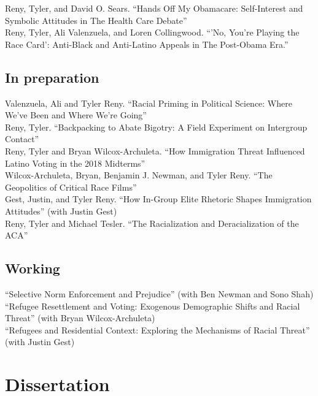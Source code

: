 \documentclass[11pt, a4paper]{article}
\newcommand{\years}[1]{\marginnote{\scriptsize #1}}
\begin{document}
\years{} Reny, Tyler, and David O. Sears. ``Hands Off My Obamacare: Self-Interest and Symbolic Attitudes in The Health Care Debate''\\

\years{} Reny, Tyler, Ali Valenzuela, and Loren Collingwood. ``'No, You’re Playing the Race Card': Anti-Black and Anti-Latino Appeals in The Post-Obama Era.''\\

\subsection*{In preparation}

\years{}Valenzuela, Ali and Tyler Reny. ``Racial Priming in Political Science: Where We've Been and Where We're Going''\\
\years{} Reny, Tyler. ``Backpacking to Abate Bigotry: A Field Experiment on Intergroup Contact''\\
\years{} Reny, Tyler and Bryan Wilcox-Archuleta. ``How Immigration Threat Influenced Latino Voting in the 2018 Midterms''\\
\years{} Wilcox-Archuleta, Bryan, Benjamin J. Newman, and Tyler Reny. ``The Geopolitics of Critical Race Films''\\
\years{} Gest, Justin, and Tyler Reny. ``How In-Group Elite Rhetoric Shapes Immigration Attitudes'' (with Justin Gest)\\
\years{} Reny, Tyler and Michael Tesler. ``The Racialization and Deracialization of the ACA''\\

\subsection*{Working}

\years{}``Selective Norm Enforcement and Prejudice'' (with Ben Newman and Sono Shah)\\
\years{}``Refugee Resettlement and Voting: Exogenous Demographic Shifts and Racial Threat'' (with Bryan Wilcox-Archuleta)\\
\years{}``Refugees and Residential Context: Exploring the Mechanisms of Racial Threat'' (with Justin Gest)\\


\section*{Dissertation}
\end{document}
